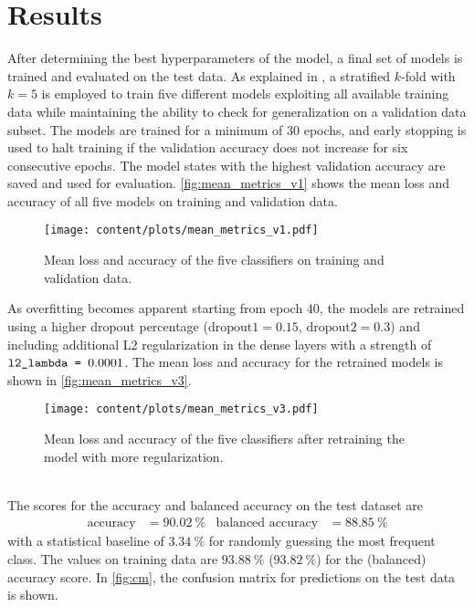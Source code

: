 \section{Results}
\label{sec:results}
After determining the best hyperparameters of the model, a final set of models is trained and evaluated on the test data. As explained in , 
a stratified $k$-fold with $k=5$ is employed to train five different models exploiting all available training data while maintaining the ability to check for generalization on 
a validation data subset. The models are trained for a minimum of $\num{30}$ epochs, and early stopping is used to halt training if the validation accuracy does not increase for six 
consecutive epochs. The model states with the highest validation accuracy are saved and used for evaluation.
\autoref{fig:mean_metrics_v1} shows the mean loss and accuracy of all five models on training and validation data.
\begin{figure}
    \centering
    \texttt{[image: content/plots/mean\_metrics\_v1.pdf]}
    \caption{Mean loss and accuracy of the five classifiers on training and validation data.}
    \label{fig:mean_metrics_v1}
\end{figure}
As overfitting becomes apparent starting from epoch $\num{40}$, the models are retrained using a higher dropout percentage ($\text{dropout1} = \num{0.15}$, $\text{dropout2} = \num{0.3}$) 
and including additional L2 regularization in the dense layers with a strength of $\texttt{l2\_lambda = \num{0.0001}}$. 
The mean loss and accuracy for the retrained models is shown in \autoref{fig:mean_metrics_v3}.
\begin{figure}
    \centering
    \texttt{[image: content/plots/mean\_metrics\_v3.pdf]}
    \caption{Mean loss and accuracy of the five classifiers after retraining the model with more regularization.}
    \label{fig:mean_metrics_v3}
\end{figure}
\\
The scores for the accuracy and balanced accuracy on the test dataset are 
\begin{align*}
    \text{accuracy} &= \qty{90.02}{\percent} & \text{balanced accuracy} &= \qty{88.85}{\percent}
\end{align*}
with a statistical baseline of $\qty{3.34}{\percent}$ for randomly guessing the most frequent class.
The values on training data are $\qty{93.88}{\percent}$ ($\qty{93.82}{\percent}$) for the (balanced) accuracy score.
In \autoref{fig:cm}, the confusion matrix for predictions on the test data is shown. 
